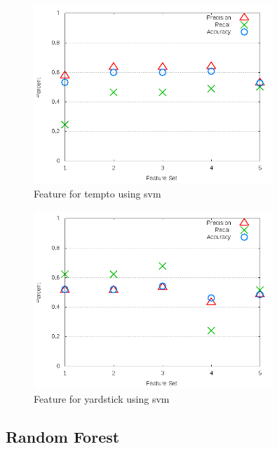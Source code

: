 \clearpage
\begin{figure}[!t]
\centering
\includegraphics[width=0.8\textwidth]{images/svm/test_3/tempto_sample_range.png}
\caption{Feature for tempto using \gls{svm}}
\label{fig:test_3_tempto_svm}
\end{figure}

\begin{figure}[!t]
\centering
\includegraphics[width=0.8\textwidth]{images/svm/test_3/yardstick_sample_range.png}
\caption{Feature for yardstick using \gls{svm}}
\label{fig:test_3_yardstick_svm}
\end{figure}


\subsection{Random Forest}
\label{app_sub:experiment_2_rf}

